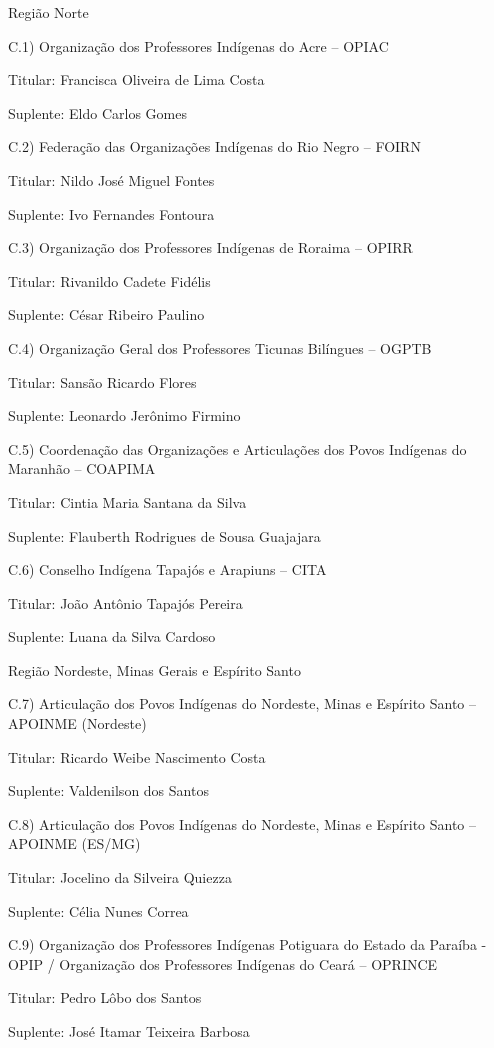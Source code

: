 \documentclass[
]{book}
\begin{document}
Região Norte

C.1) Organização dos Professores Indígenas do Acre -- OPIAC

Titular: Francisca Oliveira de Lima Costa

Suplente: Eldo Carlos Gomes

C.2) Federação das Organizações Indígenas do Rio Negro -- FOIRN

Titular: Nildo José Miguel Fontes

Suplente: Ivo Fernandes Fontoura

C.3) Organização dos Professores Indígenas de Roraima -- OPIRR

Titular: Rivanildo Cadete Fidélis

Suplente: César Ribeiro Paulino

C.4) Organização Geral dos Professores Ticunas Bilíngues -- OGPTB

Titular: Sansão Ricardo Flores

Suplente: Leonardo Jerônimo Firmino

C.5) Coordenação das Organizações e Articulações dos Povos Indígenas do Maranhão -- COAPIMA

Titular: Cintia Maria Santana da Silva

Suplente: Flauberth Rodrigues de Sousa Guajajara

C.6) Conselho Indígena Tapajós e Arapiuns -- CITA

Titular: João Antônio Tapajós Pereira

Suplente: Luana da Silva Cardoso

Região Nordeste, Minas Gerais e Espírito Santo

C.7) Articulação dos Povos Indígenas do Nordeste, Minas e Espírito Santo -- APOINME (Nordeste)

Titular: Ricardo Weibe Nascimento Costa

Suplente: Valdenilson dos Santos

C.8) Articulação dos Povos Indígenas do Nordeste, Minas e Espírito Santo -- APOINME (ES/MG)

Titular: Jocelino da Silveira Quiezza

Suplente: Célia Nunes Correa

C.9) Organização dos Professores Indígenas Potiguara do Estado da Paraíba - OPIP / Organização dos Professores Indígenas do Ceará -- OPRINCE

Titular: Pedro Lôbo dos Santos

Suplente: José Itamar Teixeira Barbosa
\end{document}
